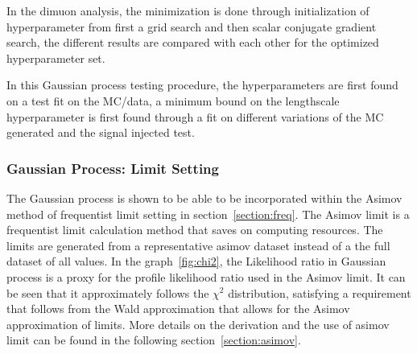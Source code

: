     In the dimuon analysis, the minimization is done through initialization of hyperparameter from first a grid search and then scalar conjugate gradient search, the different results are compared with each other for the optimized hyperparameter set.

    In this Gaussian process testing procedure, the hyperparameters are first found on a test fit on the MC/data, a minimum bound on the lengthscale hyperparameter is first found through a fit on different variations of the MC generated and the signal injected test.

    \subsubsection{Gaussian Process: Limit Setting}

    The Gaussian process is shown to be able to be incorporated within the Asimov method of frequentist limit setting in section~\ref{section:freq}. The Asimov limit is a frequentist limit calculation method that saves on computing resources. The limits are generated from a representative asimov dataset instead of a the full dataset of all values.
    In the graph~\ref{fig:chi2}, the Likelihood ratio in Gaussian process is a proxy for the profile likelihood ratio used in the Asimov limit. It can be seen that it approximately follows the $\chi^{2}$ distribution, satisfying a requirement that follows from the Wald approximation that allows for the Asimov approximation of limits.
    More details on the derivation and the use of asimov limit can be found in the following section~\ref{section:asimov}.

